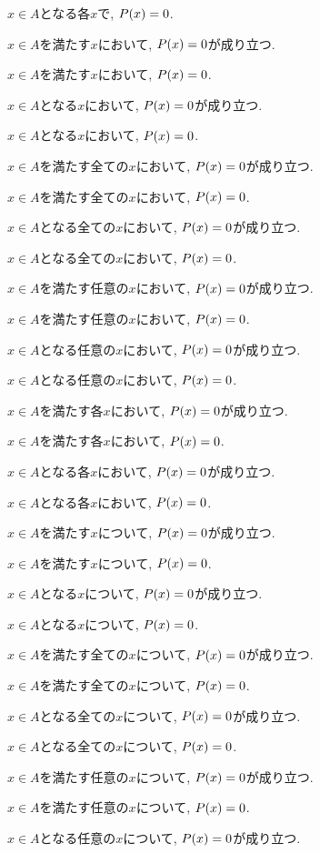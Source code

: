 \item $x\in A$となる各$x$で, $P(x)=0$.
\item $x\in A$を満たす$x$において, $P(x)=0$が成り立つ.
\item $x\in A$を満たす$x$において, $P(x)=0$.
\item $x\in A$となる$x$において, $P(x)=0$が成り立つ.
\item $x\in A$となる$x$において, $P(x)=0$.
\item $x\in A$を満たす全ての$x$において, $P(x)=0$が成り立つ.
\item $x\in A$を満たす全ての$x$において, $P(x)=0$.
\item $x\in A$となる全ての$x$において, $P(x)=0$が成り立つ.
\item $x\in A$となる全ての$x$において, $P(x)=0$.
\item $x\in A$を満たす任意の$x$において, $P(x)=0$が成り立つ.
\item $x\in A$を満たす任意の$x$において, $P(x)=0$.
\item $x\in A$となる任意の$x$において, $P(x)=0$が成り立つ.
\item $x\in A$となる任意の$x$において, $P(x)=0$.
\item $x\in A$を満たす各$x$において, $P(x)=0$が成り立つ.
\item $x\in A$を満たす各$x$において, $P(x)=0$.
\item $x\in A$となる各$x$において, $P(x)=0$が成り立つ.
\item $x\in A$となる各$x$において, $P(x)=0$.
\item $x\in A$を満たす$x$について, $P(x)=0$が成り立つ.
\item $x\in A$を満たす$x$について, $P(x)=0$.
\item $x\in A$となる$x$について, $P(x)=0$が成り立つ.
\item $x\in A$となる$x$について, $P(x)=0$.
\item $x\in A$を満たす全ての$x$について, $P(x)=0$が成り立つ.
\item $x\in A$を満たす全ての$x$について, $P(x)=0$.
\item $x\in A$となる全ての$x$について, $P(x)=0$が成り立つ.
\item $x\in A$となる全ての$x$について, $P(x)=0$.
\item $x\in A$を満たす任意の$x$について, $P(x)=0$が成り立つ.
\item $x\in A$を満たす任意の$x$について, $P(x)=0$.
\item $x\in A$となる任意の$x$について, $P(x)=0$が成り立つ.
